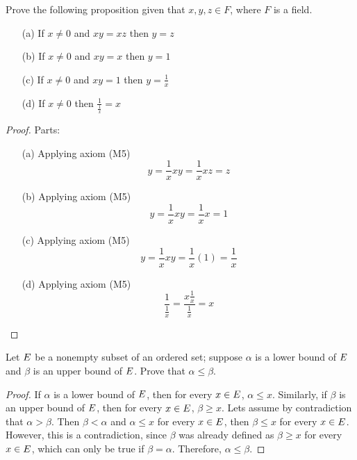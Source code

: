\documentclass[a4paper]{article}
\begin{document}
\begin{ex}[3]
Prove the following proposition given that $x, y, z \in F$, where $F$ is a field.
\begin{enumerate}
    \item[(a)] If $x \neq 0$ and $xy = xz$ then $y = z$
    \item[(b)] If $x \neq 0$ and $xy = x$ then $y = 1$
    \item[(c)] If $x \neq 0$ and $xy = 1$ then $y = \frac{1}{x}$
    \item[(d)] If $x \neq 0$ then $\frac{1}{\frac{1}{x}} = x$
\end{enumerate}
\begin{proof} Parts:
  \begin{enumerate}
      \item[(a)] Applying axiom (M5) $$y = \frac{1}{x}xy = \frac{1}{x}xz = z$$
      \item[(b)] Applying axiom (M5)
      $$y = \frac{1}{x}xy = \frac{1}{x}x = 1$$
      \item[(c)] Applying axiom (M5)
      $$y = \frac{1}{x}xy = \frac{1}{x}(1) = \frac{1}{x}$$
      \item[(d)] Applying axiom (M5)
      $$\frac{1}{\frac{1}{x}} = \frac{x\frac{1}{x}}{\frac{1}{x}} = x$$
  \end{enumerate}
\end{proof}
\end{ex}

\begin{ex}[4]
Let $\mathnormal{E}$ be a nonempty subset of an ordered set; suppose $\alpha$ is a lower bound of $\mathnormal{E}$ and $\beta$ is an upper bound of $\mathnormal{E}$. Prove that $\alpha \leq \beta$.

\begin{proof}
If $\alpha$ is a lower bound of $\mathnormal{E}$, then for every $x \in \mathnormal{E}$, $\alpha \leq x$. Similarly, if $\beta$ is an upper bound of $\mathnormal{E}$, then for every $x \in \mathnormal{E}$, $\beta \geq x$. Lets assume by contradiction that $\alpha > \beta$. Then $\beta < \alpha$ and $\alpha \leq x$ for every $x \in \mathnormal{E}$, then $\beta \leq x$ for every $x \in \mathnormal{E}$. However, this is a contradiction, since $\beta$ was already defined as $\beta \geq x$ for every $x \in \mathnormal{E}$, which can only be true if $\beta = \alpha$. Therefore, $\alpha \leq \beta$.
\end{proof}
\end{ex}
\end{document}
